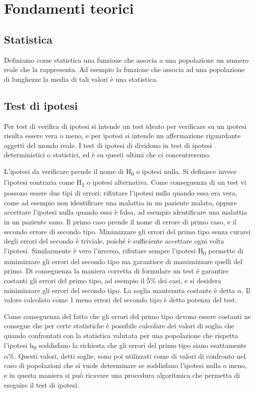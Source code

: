 \section{Fondamenti teorici}


\subsection{Statistica}
Definiamo come statistica una funzione che associa a una popolazione un numero reale che la rappresenta. Ad esempio la funzione che associa ad una popolazione di lunghezze la media di tali valori è una statistica.
 

\subsection{Test di ipotesi}
Per test di verifica di ipotesi si intende un test ideato per verificare su un ipotesi risulta essere vera o meno, e per ipotesi si intende un affermazione riguardante oggetti del mondo reale. I test di ipotesi di dividono in test di ipotesi deterministici o statistici, ed è su questi ultimi che ci concentreremo.

L'ipotesi da verificare prende il nome di H\textsubscript{0} o ipotesi nulla. Si definisce invece l'ipotesi contraria come H\textsubscript{1} o ipotesi alternativa.
Come conseguenza di un test vi possono essere due tipi di errori: rifiutare l'ipotesi nulla quando essa era vera, come ad esempio non identificare una malattia in un paziente malato, oppure accettare l'ipotesi nulla quando essa è falsa, ad esempio identificare una malattia in un paziente sano. Il primo caso prende il nome di errore di primo caso, e il secondo errore di secondo tipo.
Minimizzare gli errori del primo tipo senza curarsi degli errori del secondo è triviale, poiché è sufficiente accettare ogni volta l'ipotesi. Similarmente è vero l'inverso, rifiutare sempre l'ipotesi H\textsubscript{0} permette di minimizzare gli errori del secondo tipo ma garantisce di massimizzare quelli del primo.
Di conseguenza la maniera corretta di formulare un test é garantire costanti gli errori del primo tipo, ad esempio il 5\% dei casi, e si desidera minimizzare gli errori del secondo tipo. La soglia mantenuta costante è detta $\alpha$.
Il valore calcolato come 1 meno errori del secondo tipo è detto potenza del test.

Come conseguenza del fatto che gli errori del primo tipo devono essere costanti ne consegue che per certe statistiche è possibile calcolare dei valori di soglia che quando confrontati con la statistica valutata per una popolazione che rispetta l'ipotesi h\textsubscript{0} soddisfano la richiesta che gli errori del primo tipo siano esattamente $\alpha$\%.
Questi valori, detti soglie, sono poi utilizzati come di valori di confronto nel caso di popolazioni che si vuole determinare se soddisfano l'ipotesi nulla o meno, e in questa maniera si può ricavare una procedura algoritmica che permetta di eseguire il test di ipotesi.

